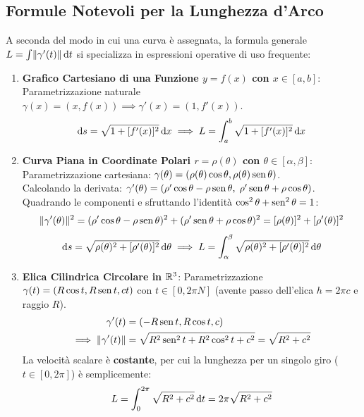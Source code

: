 \subsection{Formule Notevoli per la Lunghezza d'Arco}

A seconda del modo in cui una curva è assegnata, la formula generale $L = \int \lVert\gamma'(t)\rVert\mathop{}\!\mathrm{d} t$ si specializza in espressioni operative di uso frequente:

\begin{metodo}
\begin{enumerate}
    \item \textbf{Grafico Cartesiano di una Funzione $y = f(x)$ con $x \in [a,b]$}:
    Parametrizzazione naturale $\gamma(x) = (x, f(x)) \implies \gamma'(x) = (1, f'(x))$.
    \[
    \mathop{}\!\mathrm{d} s = \sqrt{1 + [f'(x)]^2} \mathop{}\!\mathrm{d} x \implies L = \int_{a}^{b} \sqrt{1 + [f'(x)]^2} \mathop{}\!\mathrm{d} x
    \]
    \item \textbf{Curva Piana in Coordinate Polari $r = \rho(\theta)$ con $\theta \in [\alpha, \beta]$}:
    Parametrizzazione cartesiana: $\gamma(\theta) = (\rho(\theta)\cos\theta, \rho(\theta)\operatorname{sen}\theta)$.\\
    Calcolando la derivata: $\gamma'(\theta) = (\rho'\cos\theta - \rho\operatorname{sen}\theta, \; \rho'\operatorname{sen}\theta + \rho\cos\theta)$.\\
    Quadrando le componenti e sfruttando l'identità $\cos^2\theta + \operatorname{sen}^2\theta = 1$:
    \[
    \lVert\gamma'(\theta)\rVert^2 = (\rho'\cos\theta - \rho\operatorname{sen}\theta)^2 + (\rho'\operatorname{sen}\theta + \rho\cos\theta)^2 = [\rho(\theta)]^2 + [\rho'(\theta)]^2
    \]
    \[
    \mathop{}\!\mathrm{d} s = \sqrt{\rho(\theta)^2 + [\rho'(\theta)]^2} \mathop{}\!\mathrm{d} \theta \implies L = \int_{\alpha}^{\beta} \sqrt{\rho(\theta)^2 + [\rho'(\theta)]^2} \mathop{}\!\mathrm{d} \theta
    \]
    \item \textbf{Elica Cilindrica Circolare in $\mathbb{R}^3$}:
    Parametrizzazione $\gamma(t) = (R\cos t, R\operatorname{sen} t, c t)$ con $t \in [0, 2\pi N]$ (avente passo dell'elica $h = 2\pi c$ e raggio $R$).
    \begin{align*}
    \gamma'(t) &= (-R\operatorname{sen} t, R\cos t, c) \\
    \implies \lVert\gamma'(t)\rVert &= \sqrt{R^2\operatorname{sen}^2 t + R^2\cos^2 t + c^2} = \sqrt{R^2 + c^2}
    \end{align*}
    La velocità scalare è \textbf{costante}, per cui la lunghezza per un singolo giro ($t \in [0, 2\pi]$) è semplicemente:
    \[
    L = \int_{0}^{2\pi} \sqrt{R^2 + c^2} \mathop{}\!\mathrm{d} t = 2\pi \sqrt{R^2 + c^2}
    \]
\end{enumerate}
\end{metodo}

